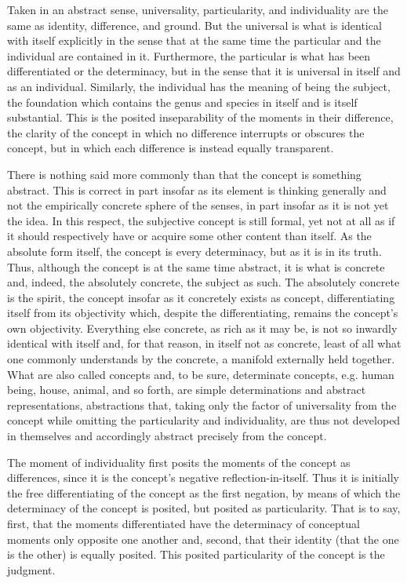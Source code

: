 Taken in an abstract sense,
universality, particularity, and individuality
are the same as identity, difference, and ground.
But the universal is what is identical with itself
explicitly in the sense that at the same time
the particular and the individual are contained in it.
Furthermore, the particular is what has been
differentiated or the determinacy,
but in the sense that it is
universal in itself and as an individual.
Similarly, the individual has
the meaning of being the subject,
the foundation which contains
the genus and species in itself
and is itself substantial.
This is the posited inseparability of
the moments in their difference,
the clarity of the concept in which
no difference interrupts or obscures the concept,
but in which each difference is instead equally transparent.

There is nothing said more commonly
than that the concept is something abstract.
This is correct in part insofar as
its element is thinking generally
and not the empirically concrete sphere of the senses,
in part insofar as it is not yet the idea.
In this respect, the subjective concept is still formal,
yet not at all as if it should respectively have or acquire
some other content than itself.
As the absolute form itself,
the concept is every determinacy,
but as it is in its truth.
Thus, although the concept is
at the same time abstract,
it is what is concrete
and, indeed, the absolutely concrete,
the subject as such.
The absolutely concrete is the spirit,
the concept insofar as it concretely exists as concept,
differentiating itself from its objectivity
which, despite the differentiating,
remains the concept's own objectivity.
Everything else concrete, as rich as it may be,
is not so inwardly identical with itself
and, for that reason, in itself not as concrete,
least of all what one commonly understands
by the concrete, a manifold externally held together.
What are also called concepts
and, to be sure, determinate concepts,
e.g. human being, house, animal, and so forth, are
simple determinations and abstract representations,
abstractions that, taking only the factor of universality
from the concept while omitting
the particularity and individuality,
are thus not developed in themselves
and accordingly abstract precisely from the concept.

The moment of individuality first posits
the moments of the concept as differences,
since it is the concept's negative reflection-in-itself.
Thus it is initially the free differentiating of
the concept as the first negation,
by means of which the determinacy of the concept is posited,
but posited as particularity.
That is to say, first, that the moments differentiated have
the determinacy of conceptual moments only opposite one another
and, second, that their identity
(that the one is the other)
is equally posited.
This posited particularity of
the concept is the judgment.

